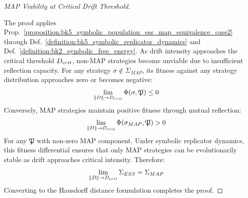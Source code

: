 \begin{proof}[MAP Viability at Critical Drift Threshold]
\label{proof:bk5_map_viability_critical_drift}
\leavevmode

The proof applies Prop.~\ref{proposition:bk5_symbolic_population_ess_map_equivalence_case2} through Def.~\ref{definition:bk5_symbolic_replicator_dynamics} and Def.~\ref{definition:bk2_symbolic_free_energy}.
As drift intensity approaches the critical threshold $D_{crit}$, non-MAP strategies become unviable due to insufficient reflection capacity.
For any strategy $\sigma \notin \Sigma_{MAP}$, its fitness against any strategy distribution approaches zero or becomes negative:
\begin{equation}
\lim_{\|D\| \to D_{crit}} \Phi(\sigma, \mathfrak{P}) \leq 0
\end{equation}
Conversely, MAP strategies maintain positive fitness through mutual reflection:
\begin{equation}
\lim_{\|D\| \to D_{crit}} \Phi(\sigma_{MAP}, \mathfrak{P}) > 0
\end{equation}
For any $\mathfrak{P}$ with non-zero MAP component.
Under symbolic replicator dynamics, this fitness differential ensures that only MAP strategies can be evolutionarily stable as drift approaches critical intensity. Therefore:
\begin{equation}
\lim_{\|D\| \to D_{crit}} \Sigma_{ESS} = \Sigma_{MAP}
\end{equation}
Converting to the Hausdorff distance formulation completes the proof.
\end{proof}
